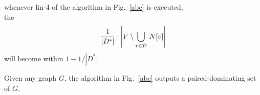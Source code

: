 \documentclass[12pt]{article}
\begin{document}
\begin{lemma}
whenever lin-4 of the algorithm in Fig.~\ref{abc} is executed, \\the 
$$
\frac{1}{|D^*|}
\cdot\left|V\setminus \bigcup_{v\in {\cal D}}\,N[v]\right|
$$
will become within $1-1/|D^*|$.

\end{lemma}


\begin{lemma}
Given any graph $G$, the algorithm in Fig.~\ref{abc} outputs a paired-dominating set of $G$.
\end{lemma}



\end{document}
